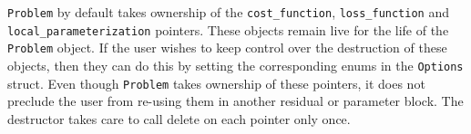   \texttt{Problem} by default takes ownership of the
  \texttt{cost\_function}, \texttt{loss\_function} and \\ \texttt{local\_parameterization} pointers. These objects remain
   live for the life of the \texttt{Problem} object. If the user wishes to
  keep control over the destruction of these objects, then they can
  do this by setting the corresponding enums in the \texttt{Options} struct. Even though \texttt{Problem} takes ownership of these pointers,  it does not preclude the user from re-using them in another residual or parameter block. The destructor takes care to call
  delete on each  pointer only once.
